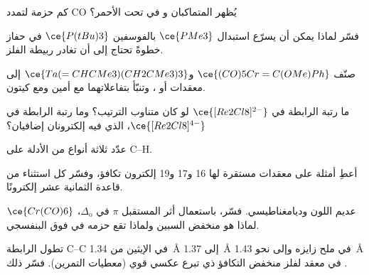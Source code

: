 \begin{exercise}[$\star\star$]\label{exo:b3:organometallic-bonding:5}
كم حزمة لتمدد CO يُظهر المتماكبان  و في تحت الأحمر؟
\end{exercise}

\begin{exercise}[$\star\star$]\label{exo:b3:organometallic-bonding:6}
فسّر لماذا يمكن أن يسرّع استبدال $\ce{PMe3}$ بالفوسفين $\ce{P(tBu)3}$ في حفاز خطوةً تحتاج إلى أن
تغادر ربيطة الفلز.
\end{exercise}

\begin{exercise}[$\star\star$]\label{exo:b3:organometallic-bonding:7}
صنّف $\ce{(CO)5Cr=C(OMe)Ph}$ و$\ce{Ta(=CHCMe3)(CH2CMe3)3}$ إلى معقدات  أو ، وتنبّأ بتفاعلاتهما مع أمين ومع كيتون.
\end{exercise}

\begin{exercise}[$\star\star$]\label{exo:b3:organometallic-bonding:8}
ما رتبة الرابطة في $\ce{[Re2Cl8]^{2-}}$ لو كان متناوب الترتيب؟ وما رتبة الرابطة في
$\ce{[Re2Cl8]^{4-}}$، الذي فيه إلكترونان إضافيان؟
\end{exercise}

\begin{exercise}[$\star\star$]\label{exo:b3:organometallic-bonding:9}
عدّد ثلاثة أنواع من الأدلة على  C--H.
\end{exercise}

\begin{exercise}[$\star\star\star$]\label{exo:b3:organometallic-bonding:10}
أعطِ أمثلة على معقدات مستقرة لها 16 و17 و19 إلكترون تكافؤ، وفسّر
كل استثناء من قاعدة الثمانية عشر إلكترونًا.
\end{exercise}

\begin{exercise}[$\star\star\star$]\label{exo:b3:organometallic-bonding:11}
$\ce{Cr(CO)6}$ عديم اللون وديامغناطيسي. فسّر، باستعمال أثر المستقبل $\pi$ في $\Delta_{\mathrm o}$،
لماذا هو منخفض السبين ولماذا تقع حزمه  في فوق البنفسجي.
\end{exercise}

\begin{exercise}[$\star\star\star$]\label{exo:b3:organometallic-bonding:12}
تطول الرابطة C--C في الإيثين من \qty{1.34}{\angstrom} إلى \qty{1.37}{\angstrom} في ملح زايزه وإلى
نحو \qty{1.43}{\angstrom} في معقد لفلز منخفض التكافؤ ذي تبرع عكسي قوي (معطيات
التمرين). فسّر ذلك .
\end{exercise}

